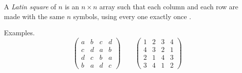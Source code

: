 \documentclass{article}
\begin{document}
A \emph{Latin square} of $n$ is an $n\times n$ array such that each column and each row are made with the same $n$ symbols, using every one exactly once .

Examples.
\begin{equation*}
\left(\begin{array}{cccc}
a & b & c & d\\
c & d & a &b\\
d & c & b & a\\
b & a & d & c
\end{array}\right)
\qquad
\left(\begin{array}{cccc}
1 & 2&  3&  4\\
4 & 3 & 2 & 1\\
2 & 1 & 4 & 3\\
3 & 4 & 1 & 2
\end{array}\right)
\end{equation*}
\end{document}
